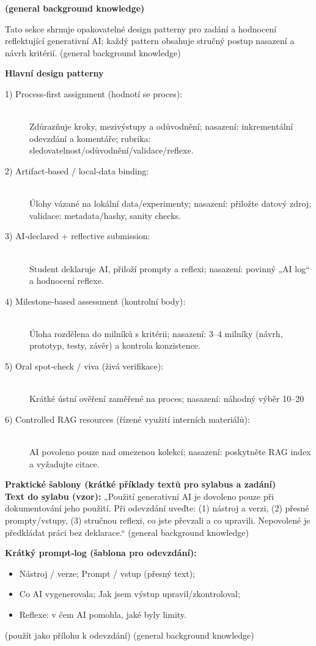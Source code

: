 \textbf{(general background knowledge)}\par
Tato sekce shrnuje opakovatelné design patterny pro zadání a hodnocení reflektující generativní AI; každý pattern obsahuje stručný postup nasazení a návrh kritérií. (general background knowledge)

\medskip
\textbf{Hlavní design patterny}
\begin{description}
  \item[1) Process‑first assignment (hodnotí se proces):] \hfill \\
    Zdůrazňuje kroky, mezivýstupy a odůvodnění; nasazení: inkrementální odevzdání a komentáře; rubrika: sledovatelnost/odůvodnění/validace/reflexe.
  \item[2) Artifact‑based / local‑data binding:] \hfill \\
    Úlohy vázané na lokální data/experimenty; nasazení: přiložte datový zdroj; validace: metadata/hashy, sanity checks.
  \item[3) AI‑declared + reflective submission:] \hfill \\
    Student deklaruje AI, přiloží prompty a reflexi; nasazení: povinný „AI log“ a hodnocení reflexe.
  \item[4) Milestone‑based assessment (kontrolní body):] \hfill \\
    Úloha rozdělena do milníků s kritérii; nasazení: 3–4 milníky (návrh, prototyp, testy, závěr) a kontrola konzistence.
  \item[5) Oral spot‑check / viva (živá verifikace):] \hfill \\
    Krátké ústní ověření zaměřené na proces; nasazení: náhodný výběr 10–20 %
  \item[6) Controlled RAG resources (řízené využití interních materiálů):] \hfill \\
    AI povoleno pouze nad omezenou kolekcí; nasazení: poskytněte RAG index a vyžadujte citace.
\end{description}

\medskip
\textbf{Praktické šablony (krátké příklady textů pro sylabus a zadání)}\\
\textbf{Text do sylabu (vzor):} „Použití generativní AI je dovoleno pouze při dokumentování jeho použití. Při odevzdání uveďte: (1) nástroj a verzi, (2) přesné prompty/vstupy, (3) stručnou reflexi, co jste převzali a co upravili. Nepovolené je předkládat práci bez deklarace.“ (general background knowledge)

\textbf{Krátký prompt‑log (šablona pro odevzdání):}
\begin{itemize}
  \item Nástroj / verze; Prompt / vstup (přesný text);
  \item Co AI vygenerovala; Jak jsem výstup upravil/zkontroloval;
  \item Reflexe: v čem AI pomohla, jaké byly limity.
\end{itemize}
(použít jako přílohu k odevzdání) (general background knowledge)

